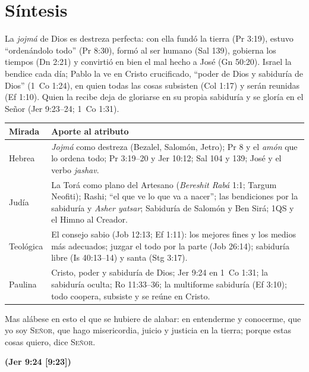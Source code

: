 \documentclass[11pt,letterpaper]{article}
\newcommand{\SENOR}{\textsc{Señor}}
\newcommand{\fuente}[1]{\par\hfill{\upshape\bfseries\small\textcolor{azul}{#1}}}
\begin{document}
\section{Síntesis}

\begin{tcolorbox}[colback=papiro,colframe=azul,boxrule=1pt,arc=3pt]
La \emph{jojmá} de Dios es destreza perfecta: con ella fundó la tierra (Pr 3:19), estuvo ``ordenándolo todo'' (Pr 8:30), formó al ser humano (Sal 139), gobierna los tiempos (Dn 2:21) y convirtió en bien el mal hecho a José (Gn 50:20). Israel la bendice cada día; Pablo la ve en Cristo crucificado, ``poder de Dios y sabiduría de Dios'' (1~Co 1:24), en quien todas las cosas subsisten (Col 1:17) y serán reunidas (Ef 1:10). Quien la recibe deja de gloriarse en su propia sabiduría y se gloría en el Señor (Jer 9:23--24; 1~Co 1:31).
\end{tcolorbox}

\begin{center}\small\renewcommand{\arraystretch}{1.3}
\begin{tabular}{@{}L{3.0cm}L{11.4cm}@{}}
\toprule
\textbf{Mirada} & \textbf{Aporte al atributo} \\ \midrule
Hebrea & \emph{Jojmá} como destreza (Bezalel, Salomón, Jetro); Pr 8 y el \emph{amón} que lo ordena todo; Pr 3:19--20 y Jer 10:12; Sal 104 y 139; José y el verbo \emph{jashav}. \\
Judía & La Torá como plano del Artesano (\emph{Bereshit Rabá} 1:1; Targum Neofiti); Rashi; ``el que ve lo que va a nacer''; las bendiciones por la sabiduría y \emph{Asher yatsar}; Sabiduría de Salomón y Ben Sirá; 1QS y el Himno al Creador. \\
Teológica & El consejo sabio (Job 12:13; Ef 1:11): los mejores fines y los medios más adecuados; juzgar el todo por la parte (Job 26:14); sabiduría libre (Is 40:13--14) y santa (Stg 3:17). \\
Paulina & Cristo, poder y sabiduría de Dios; Jer 9:24 en 1~Co 1:31; la sabiduría oculta; Ro 11:33--36; la multiforme sabiduría (Ef 3:10); todo coopera, subsiste y se reúne en Cristo. \\
\bottomrule
\end{tabular}\end{center}

\begin{cita}Mas alábese en esto el que se hubiere de alabar: en entenderme y conocerme, que yo soy \SENOR, que hago misericordia, juicio y justicia en la tierra; porque estas cosas quiero, dice \SENOR.\fuente{(Jer 9:24 [9:23])}\end{cita}
\end{document}
